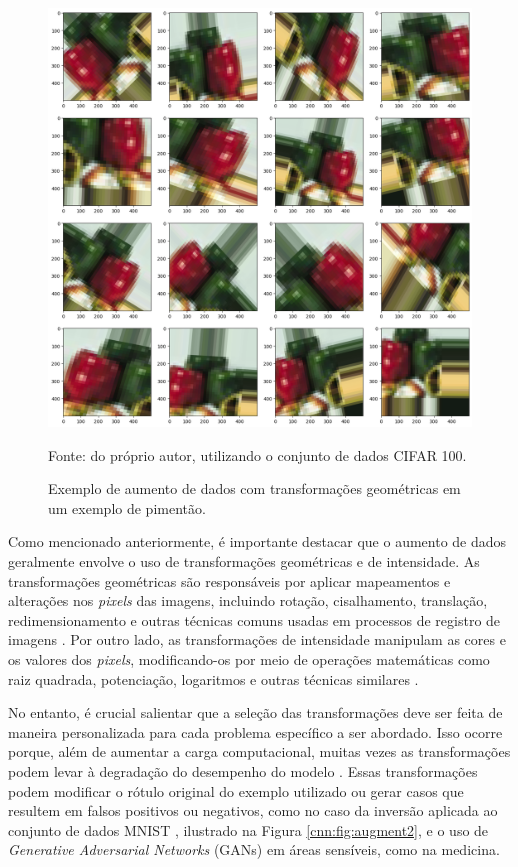 \begin{figure}[H]
    \centering
    \caption{Exemplo de aumento de dados com transformações geométricas em um exemplo de pimentão.}
    \includegraphics[width=1\linewidth]{recursos/imagens/deep/dataaugmentation.png}
    \label{cnn:fig:augment}

     Fonte: do próprio autor, utilizando o conjunto de dados CIFAR 100\citep{Bossard2014Food-101Forests}.
\end{figure}

Como mencionado anteriormente, é importante destacar que o aumento de dados geralmente envolve o uso de transformações geométricas e de intensidade. As transformações geométricas são responsáveis por aplicar mapeamentos e alterações nos \textit{pixels} das imagens, incluindo rotação, cisalhamento, translação, redimensionamento e outras técnicas comuns usadas em processos de registro de imagens \citep{pedrini2008analise}. Por outro lado, as transformações de intensidade manipulam as cores e os valores dos \textit{pixels}, modificando-os por meio de operações matemáticas como raiz quadrada, potenciação, logaritmos e outras técnicas similares \citep{pedrini2008analise}.

No entanto, é crucial salientar que a seleção das transformações deve ser feita de maneira personalizada para cada problema específico a ser abordado. Isso ocorre porque, além de aumentar a carga computacional, muitas vezes as transformações podem levar à degradação do desempenho do modelo \citep{Carneiro2021EfficientProcessing, Hyttinen2020}. Essas transformações podem modificar o rótulo original do exemplo utilizado ou gerar casos que resultem em falsos positivos ou negativos, como no caso da inversão aplicada ao conjunto de dados MNIST \citep{LeCun2010MNISTDatabase}, ilustrado na Figura \ref{cnn:fig:augment2}, e o uso de \textit{Generative Adversarial Networks} (GANs) em áreas sensíveis, como na medicina.


